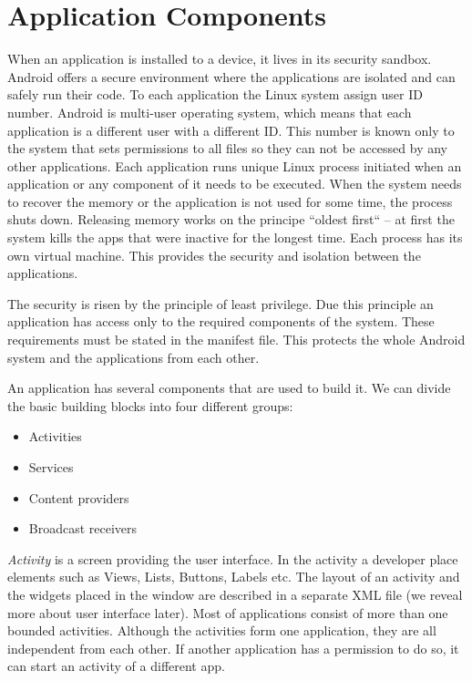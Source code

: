 \section{Application Components}
When an application is installed to a device, it lives in its security sandbox.
Android offers a secure environment where the applications are isolated and can safely run their code.
To each application the Linux system assign user ID number. 
Android is multi-user operating system, which means that each application is a different user with a different ID.
This number is known only to the system that sets permissions to all files so they can not be accessed by any other applications.
Each application runs unique Linux process initiated when an application or any component of it needs to be executed.
When the system needs to recover the memory or the application is not used for some time, the process shuts down.
Releasing memory works on the principe ``oldest first`` -- at first the system kills the apps that were inactive for the longest time.
Each process has its own virtual machine. This provides the security and isolation between the applications.

The security is risen by the principle of least privilege.
Due this principle an application has access only to the required components of the system. 
These requirements must be stated in the manifest file.
This protects the whole Android system and the applications from each other.

An application has several components that are used to build it.
We can divide the basic building blocks into four different groups:
\begin{itemize}
\item{Activities}
\item{Services}
\item{Content providers}
\item{Broadcast receivers}
\end{itemize}

\emph{Activity} is a screen providing the user interface.
In the activity a developer place elements such as Views, Lists, Buttons, Labels etc. 
The layout of an activity and the widgets placed in the window are described in a separate XML file (we reveal more about user interface later).
Most of applications consist of more than one bounded activities.
Although the activities form one application, they are all independent from each other.
If another application has a permission to do so, it can start an activity of a different app.

